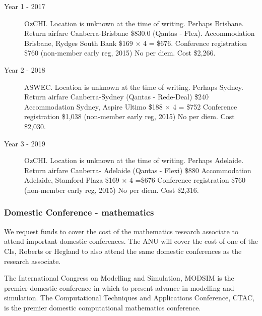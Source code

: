 \documentclass[a4paper,fontsize=12pt]{scrartcl}
\begin{document}
\begin{description}
\item[Year 1 - 2017] OzCHI. 
Location is unknown at the time of writing. Perhaps Brisbane. 
Return airfare Canberra-Brisbane \$830.0 (Qantas - Flex). Accommodation Brisbane, 
Rydges South Bank \$169 $\times$  4 = \$676. 
Conference registration \$760 (non-member early reg, 2015) No per diem. Cost \$2,266. 

\item[Year 2 - 2018] ASWEC.
Location is unknown at the time of writing. Perhaps Sydney.
Return airfare Canberra-Sydney (Qantas - Rede-Deal) \$240
Accommodation Sydney, Aspire Ultimo \$188 $\times$ 4 = \$752
Conference registration \$1,038 (non-member early reg, 2015) 
No per diem. Cost \$2,030.



\item[Year 3 -  2019] OzCHI.
Location is unknown at the time of writing. Perhaps Adelaide.
Return airfare Canberra- Adelaide (Qantas - Flexi) \$880
Accommodation Adelaide, Stamford Plaza \$169 $\times$ 4 =\$676
Conference registration \$760 (non-member early reg, 2015)
No per diem. Cost \$2,316.


\end{description}



\subsubsection*{Domestic Conference - mathematics}

We request funds to cover the cost of the mathematics research associate to attend important domestic conferences.  The ANU will cover the cost of one of the CIs, Roberts or Hegland to also attend the same domestic conferences as the research associate. 

The International Congress on Modelling and Simulation, MODSIM is the premier domestic conference in which to present advance in modelling and simulation. 
The Computational Techniques and Applications Conference, CTAC, is the premier domestic computational mathematics conference.
\end{document}
